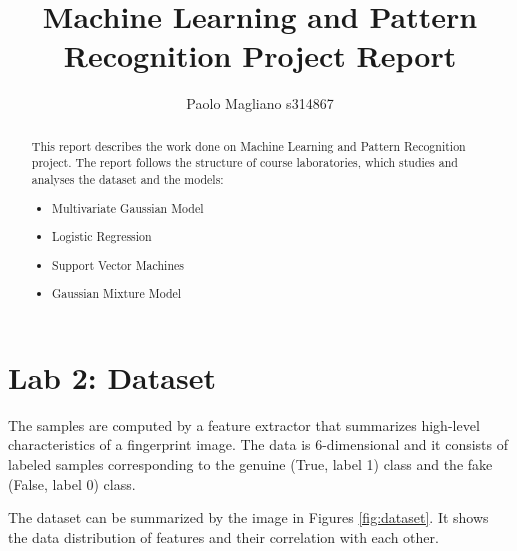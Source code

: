 \documentclass{article}
\title{Machine Learning and Pattern Recognition Project Report}
\author{Paolo Magliano s314867}
\begin{document}
\maketitle

\begin{abstract}
This report describes the work done on Machine Learning and Pattern Recognition project. The report follows the structure of course laboratories, which studies and analyses the dataset and the models:
\begin{itemize}
    \item Multivariate Gaussian Model
    \item Logistic Regression
    \item Support Vector Machines
    \item Gaussian Mixture Model
\end{itemize}
\end{abstract}


\section{Lab 2: Dataset}
\label{sec:dataset}
The samples are computed by a feature extractor that summarizes high-level characteristics of a fingerprint image. The data is 6-dimensional and it consists of labeled samples corresponding to the genuine (True, label 1) class and the fake (False, label 0) class.

The dataset can be summarized by the image in Figures \ref{fig:dataset}. It shows the data distribution of features and their correlation with each other.
\end{document}
